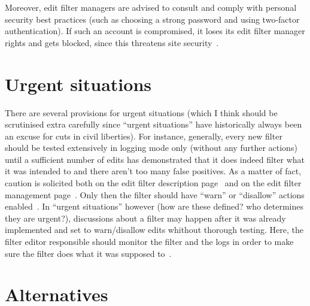 Moreover, edit filter managers are advised to consult and comply with personal security best practices (such as choosing a strong password and using two-factor authentication).
If such an account is compromised, it loses its edit filter manager rights and gets blocked, since this threatens site security~\cite{Wikipedia:EditFilter}.

\section{Urgent situations}

There are several provisions for urgent situations (which I think should be scrutinised extra carefully since ``urgent situations'' have historically always been an excuse for cuts in civil liberties).
For instance, generally, every new filter should be tested extensively in logging mode only (without any further actions) until a sufficient number of edits has demonstrated that it does indeed filter what it was intended to and there aren't too many false positives.
As a matter of fact, caution is solicited both on the edit filter description page~\cite{Wikipedia:EditFilter} and on the edit filter management page~\cite{Wikipedia:EditFilterManagement}.
Only then the filter should have ``warn'' or ``disallow'' actions enabled~\cite{Wikipedia:EditFilter}.
In ``urgent situations'' however (how are these defined? who determines they are urgent?), discussions about a filter may happen after it was already implemented and set to warn/disallow edits whithout thorough testing.
Here, the filter editor responsible should monitor the filter and the logs in order to make sure the filter does what it was supposed to~\cite{Wikipedia:EditFilter}.

\section{Alternatives}

